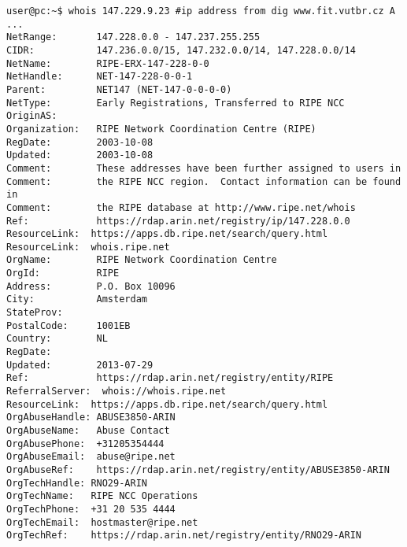 \documentclass[a4paper, 11pt]{article}
\begin{document}
\begin{lstlisting}[caption={Referenčný Whois dotaz nad doménov \textbf{www.fit.vutbr.cz}.},captionpos=b, label={whois_refer_2}]
user@pc:~$ whois 147.229.9.23 #ip address from dig www.fit.vutbr.cz A
...
NetRange:       147.228.0.0 - 147.237.255.255
CIDR:           147.236.0.0/15, 147.232.0.0/14, 147.228.0.0/14
NetName:        RIPE-ERX-147-228-0-0
NetHandle:      NET-147-228-0-0-1
Parent:         NET147 (NET-147-0-0-0-0)
NetType:        Early Registrations, Transferred to RIPE NCC
OriginAS:       
Organization:   RIPE Network Coordination Centre (RIPE)
RegDate:        2003-10-08
Updated:        2003-10-08
Comment:        These addresses have been further assigned to users in
Comment:        the RIPE NCC region.  Contact information can be found in
Comment:        the RIPE database at http://www.ripe.net/whois
Ref:            https://rdap.arin.net/registry/ip/147.228.0.0
ResourceLink:  https://apps.db.ripe.net/search/query.html
ResourceLink:  whois.ripe.net
OrgName:        RIPE Network Coordination Centre
OrgId:          RIPE
Address:        P.O. Box 10096
City:           Amsterdam
StateProv:      
PostalCode:     1001EB
Country:        NL
RegDate:        
Updated:        2013-07-29
Ref:            https://rdap.arin.net/registry/entity/RIPE
ReferralServer:  whois://whois.ripe.net
ResourceLink:  https://apps.db.ripe.net/search/query.html
OrgAbuseHandle: ABUSE3850-ARIN
OrgAbuseName:   Abuse Contact
OrgAbusePhone:  +31205354444 
OrgAbuseEmail:  abuse@ripe.net
OrgAbuseRef:    https://rdap.arin.net/registry/entity/ABUSE3850-ARIN
OrgTechHandle: RNO29-ARIN
OrgTechName:   RIPE NCC Operations
OrgTechPhone:  +31 20 535 4444 
OrgTechEmail:  hostmaster@ripe.net
OrgTechRef:    https://rdap.arin.net/registry/entity/RNO29-ARIN
\end{lstlisting}
\end{document}
